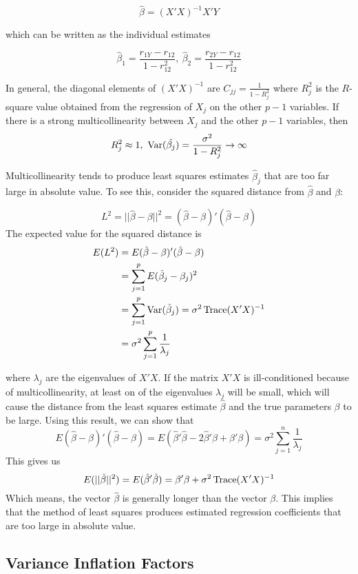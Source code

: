 \[\hat{\beta} = (X'X)^{-1}X'Y\]

which can be written as the individual estimates

\[\hat{\beta}_1 = \frac{r_{1Y} - r_{12}}{1-r_{12}^2}, \ \hat{\beta}_2 = \frac{r_{2Y} - r_{12}}{1-r_{12}^2}\]

In general, the diagonal elements of $(X'X)^{-1}$ are $C_{jj} = \frac{1}{1-R_j^2}$ where $R_j^2$ is the $R$-square value obtained from the regression of $X_j$ on the other $p-1$ variables. If there is a strong multicollinearity between $X_j$ and the other $p-1$ variables, then 
\[R_j^2 \approx 1, \ \Var(\hat{\beta_j}) = \frac{\sigma^2}{1-R_j^2} \rightarrow \infty\]

Multicollinearity tends to produce least squares estimates $\hat{\beta}_j$ that are too far large in absolute value. To see this, consider the squared distance from $\hat{\beta}$ and $\beta$:

\[L^2 = ||\hat{\beta}-\beta||^2 = (\hat{\beta}-\beta)'(\hat{\beta}- \beta)\]
The expected value for the squared distance is 
\begin{align*}
    E(L^2) &= E(\hat{\beta} - \beta)'(\hat{\beta} - \beta)\\
           &= \sum_{j=1}^p E(\hat{\beta}_j - \beta_j)^2\\
           &= \sum_{j=1}^p \operatorname{Var}(\hat{\beta}_j) = \sigma^2\operatorname{Trace}(X'X)^{-1}\\
           &= \sigma^2 \sum_{j=1}^p \frac{1}{\lambda_j} 
\end{align*}

where $\lambda_j$ are the eigenvalues of $X'X$. If the matrix $X'X$ is ill-conditioned because of multicollinearity, at least on of the eigenvalues $\lambda_j$ will be small, which will cause the distance from the least squares estimate $\hat{\beta}$ and the true parameters $\beta$ to be large. Using this result, we can show that 
\[E(\hat{\beta}-\beta)'(\hat{\beta} - \beta) = E(\hat{\beta}'\hat{\beta} - 2\hat{\beta}'\beta + \beta'\beta) = \sigma^2 \sum_{j=1}^n \frac{1}{\lambda_j}\]
This gives us 
\[E(||\hat{\beta}||^2) = E(\hat{\beta}'\hat{\beta}) = \beta'\beta + \sigma^2\operatorname{Trace}(X'X)^{-1}\]
Which means, the vector $\hat{\beta}$ is generally longer than the vector $\beta$. This implies that the method of least squares produces estimated regression coefficients that are too large in absolute value.


\subsection{Variance Inflation Factors}

